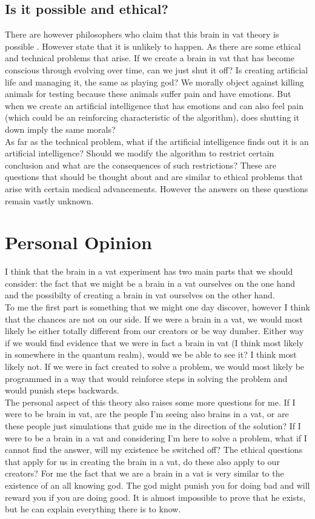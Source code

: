 \documentclass[a4paper]{article}
\begin{document}
\subsection{Is it possible and ethical?}
There are however philosophers who claim that this brain in vat theory is possible \cite{IsPossible}. However state that it is unlikely to happen. As there are some ethical and technical problems that arise. If we create a brain in vat that has become conscious through evolving over time, can we just shut it off? Is creating artificial life and managing it, the same as playing god? We morally object against killing animals for testing because these animals suffer pain and have emotions. But when we create an artificial intelligence that has emotions and can also feel pain (which could be an reinforcing characteristic of the algorithm), does shutting it down imply the same morals?\\
As far as the technical problem, what if the artificial intelligence finds out it is an artificial intelligence? Should we modify the algorithm to restrict certain conclusion and what are the consequences of such restrictions? These are questions that should be thought about and are similar to ethical problems that arise with certain medical advancements. However the answers on these questions remain vastly unknown. 

\section{Personal Opinion}
I think that the brain in a vat experiment has two main parts that we should consider: the fact that we might be a brain in a vat ourselves on the one hand and the possibilty of creating a brain in vat ourselves on the other hand.\\

To me the first part is something that we might one day discover, however I think that the chances are not on our side. If we were a brain in a vat, we would most likely be either totally different from our creators or be way dumber. Either way if we would find evidence that we were in fact a brain in vat (I think most likely in somewhere in the quantum realm), would we be able to see it? I think most likely not. If we were in fact created to solve a problem, we would most likely be programmed in a way that would reinforce steps in solving the problem and would punish steps backwards.\\
The personal aspect of this theory also raises some more questions for me. If I were to be brain in vat, are the people I'm seeing also brains in a vat, or are these people just simulations that guide me in the direction of the solution? If I were to be a brain in a vat and considering I'm here to solve a problem, what if I cannot find the answer, will my existence be switched off? The ethical questions that apply for us in creating the brain in a vat, do these also apply to our creators? For me the fact that we are a brain in a vat is very similar to the existence of an all knowing god. The god might punish you for doing bad and will reward you if you are doing good. It is almost impossible to prove that he exists, but he can explain everything there is to know.
\end{document}
